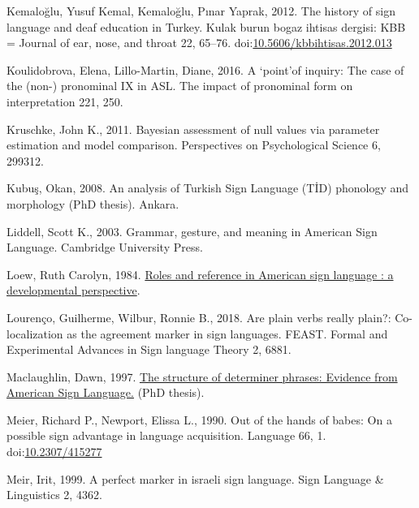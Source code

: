 \documentclass[]{elsarticle} %
\newlength{\cslhangindent}
\newenvironment{CSLReferences}[2] %
 {%
  \setlength{\parindent}{0pt}
  \ifodd #1 \everypar{\setlength{\hangindent}{\cslhangindent}}\ignorespaces\fi
  \ifnum #2 > 0
  \setlength{\parskip}{#2\baselineskip}
  \fi
 }%
 {}
\begin{document}
\begin{CSLReferences}{1}{0}
\leavevmode{}%
Kemaloğlu, Yusuf Kemal, Kemaloğlu, Pınar Yaprak, 2012. The history of
sign language and deaf education in Turkey. Kulak burun bogaz ihtisas
dergisi: KBB = Journal of ear, nose, and throat 22, 65--76.
doi:\href{https://doi.org/10.5606/kbbihtisas.2012.013}{10.5606/kbbihtisas.2012.013}

\leavevmode{}%
Koulidobrova, Elena, Lillo-Martin, Diane, 2016. A {`}point{'}of inquiry:
The case of the (non-) pronominal IX in ASL. The impact of pronominal
form on interpretation 221, 250.

\leavevmode{}%
Kruschke, John K., 2011. Bayesian assessment of null values via
parameter estimation and model comparison. Perspectives on Psychological
Science 6, 299312.

\leavevmode{}%
Kubuş, Okan, 2008. An analysis of Turkish Sign Language (T{İ}D)
phonology and morphology (PhD thesis). Ankara.

\leavevmode{}%
Liddell, Scott K., 2003. Grammar, gesture, and meaning in American Sign
Language. Cambridge University Press.

\leavevmode{}%
Loew, Ruth Carolyn, 1984.
\href{https:///paper/Roles-and-reference-in-American-sign-language-\%3A-a-Loew/315c2c539d3bd88fbc13564775141ba4a60ac5aa}{Roles
and reference in American sign language : a developmental perspective}.

\leavevmode{}%
Lourenço, Guilherme, Wilbur, Ronnie B., 2018. Are plain verbs really
plain?: Co-localization as the agreement marker in sign languages.
FEAST. Formal and Experimental Advances in Sign language Theory 2, 6881.

\leavevmode{}%
Maclaughlin, Dawn, 1997.
\href{http://lear.unive.it/jspui/handle/11707/7016}{The structure of
determiner phrases: Evidence from American Sign Language.} (PhD thesis).

\leavevmode{}%
Meier, Richard P., Newport, Elissa L., 1990. Out of the hands of babes:
On a possible sign advantage in language acquisition. Language 66, 1.
doi:\href{https://doi.org/10.2307/415277}{10.2307/415277}

\leavevmode{}%
Meir, Irit, 1999. A perfect marker in israeli sign language. Sign
Language \& Linguistics 2, 4362.


\end{CSLReferences}
\end{document}
